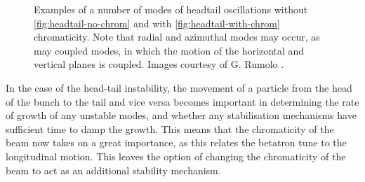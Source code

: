 \begin{figure}
\begin{center}
\end{center}
\caption{Examples of a number of modes of headtail oscillations without \ref{fig:headtail-no-chrom} and with \ref{fig:headtail-with-chrom} chromaticity. Note that radial and azimuthal modes may occur, as may coupled modes, in which the motion of the horizontal and vertical planes is coupled. Images courtesy of G. Rumolo \cite{Rumolo:IntroInstab}.}
\label{fig:trans_oscillations}
\end{figure}


In the case of the head-tail instability, the movement of a particle from the head of the bunch to the tail and vice versa becomes important in determining the rate of growth of any unstable modes, and whether any stabilisation mechanisms have sufficient time to damp the growth. This means that the chromaticity of the beam now takes on a great importance, as this relates the betatron tune to the longitudinal motion. This leaves the option of changing the chromaticity of the beam to act as an additional stability mechanism.

